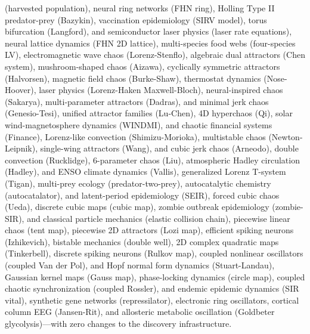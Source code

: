 \documentclass{article}
\begin{document}
(harvested population), neural ring networks (FHN ring),
Holling Type II predator-prey (Bazykin), vaccination epidemiology
(SIRV model), torus bifurcation (Langford), and semiconductor laser
physics (laser rate equations), neural lattice dynamics (FHN 2D lattice),
multi-species food webs (four-species LV), electromagnetic wave chaos
(Lorenz-Stenflo), algebraic dual attractors (Chen system),
mushroom-shaped chaos (Aizawa), cyclically symmetric attractors (Halvorsen),
magnetic field chaos (Burke-Shaw), thermostat dynamics
(Nose-Hoover), laser physics (Lorenz-Haken Maxwell-Bloch), neural-inspired
chaos (Sakarya), multi-parameter attractors (Dadras), and minimal jerk chaos
(Genesio-Tesi), unified attractor families (Lu-Chen), 4D hyperchaos (Qi),
solar wind-magnetosphere dynamics (WINDMI), and chaotic financial systems
(Finance), Lorenz-like convection (Shimizu-Morioka), multistable chaos
(Newton-Leipnik), single-wing attractors (Wang), and cubic jerk chaos
(Arneodo), double convection (Rucklidge), 6-parameter chaos (Liu),
atmospheric Hadley circulation (Hadley), and ENSO climate dynamics
(Vallis), generalized Lorenz T-system (Tigan), multi-prey ecology
(predator-two-prey), autocatalytic chemistry (autocatalator), and latent-period
epidemiology (SEIR), forced cubic chaos (Ueda), discrete cubic maps
(cubic map), zombie outbreak epidemiology (zombie-SIR), and classical
particle mechanics (elastic collision chain), piecewise linear chaos
(tent map), piecewise 2D attractors (Lozi map), efficient spiking neurons
(Izhikevich), bistable mechanics (double well), 2D complex quadratic maps
(Tinkerbell), discrete spiking neurons (Rulkov map), coupled nonlinear
oscillators (coupled Van der Pol), and Hopf normal form dynamics
(Stuart-Landau), Gaussian kernel maps (Gauss map), phase-locking dynamics
(circle map), coupled chaotic synchronization (coupled Rossler), and
endemic epidemic dynamics (SIR vital), synthetic gene networks
(repressilator), electronic ring oscillators, cortical column EEG
(Jansen-Rit), and allosteric metabolic oscillation
(Goldbeter glycolysis)---with zero changes to the discovery infrastructure.
\end{document}
